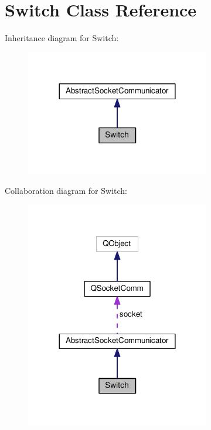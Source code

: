 \hypertarget{class_switch}{\section{Switch Class Reference}
\label{class_switch}
}


Inheritance diagram for Switch\+:\nopagebreak
\begin{figure}[H]
\begin{center}
\leavevmode
\includegraphics[width=228pt]{class_switch__inherit__graph}
\end{center}
\end{figure}


Collaboration diagram for Switch\+:\nopagebreak
\begin{figure}[H]
\begin{center}
\leavevmode
\includegraphics[width=228pt]{class_switch__coll__graph}
\end{center}
\end{figure}
